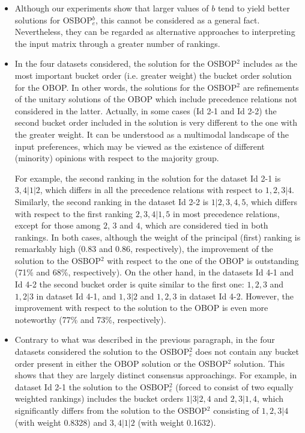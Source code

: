 \documentclass[preprint,12pt]{article}
\theoremstyle{definition}
\theoremstyle{remark}
\theoremstyle{example} %
\begin{document}
\begin{itemize}   
    \item Although our experiments show that larger values of
$b$ tend to yield better solutions for OSBOP$^b_e$, this cannot be considered as a general fact. Nevertheless, they can be regarded as alternative approaches to interpreting the input matrix through a greater number of rankings.

    \item In the four datasets considered, the solution for the OSBOP$^2$ includes as the most important bucket order (i.e. greater weight) the bucket order  solution for the OBOP. In other words, the solutions for the OSBOP$^2$ are refinements of the unitary solutions of the OBOP which include precedence relations not considered in the latter.
   Actually, in some cases (Id 2-1 and Id 2-2) the second bucket order included in the solution is very different to the one with the greater weight. 
   It can be understood as a multimodal landscape of the input preferences, which may be viewed as the existence of different (minority) opinions with respect to the majority group.  
   
   For example, the second ranking in the solution for the dataset Id 2-1 is $3,4|1|2$, which differs in all the precedence relations with respect to  $1,2,3|4$. Similarly, the second ranking in  the dataset Id 2-2 is $1|2,3,4,5$, which differs with respect to the first ranking $2,3,4|1,5$ in most precedence relations, except for those among $2$, $3$ and $4$, which are considered tied in both rankings. In both cases, although the weight of the principal (first) ranking is remarkably high  (0.83 and 0.86, respectively), the improvement of the solution to the OSBOP$^2$ with respect to the one of the OBOP is outstanding (71\% and 68\%, respectively). 
   On the other hand, in the datasets Id 4-1 and Id 4-2 the second bucket order is quite similar to the first one: $1,2,3$ and $1,2|3$ in dataset Id 4-1, and $1,3|2$ and $1,2,3$ in dataset Id 4-2. However, the improvement with respect to the solution to the OBOP is even more noteworthy (77\% and 73\%, respectively).
   
   \item Contrary to what was described in the previous paragraph, in the four datasets considered the solution to the OSBOP$^2_e$  does not contain any bucket order present in either the OBOP solution or the OSBOP$^2$ solution.
    This shows that they are largely distinct consensus approachings. For example, in dataset Id 2-1 the solution to the OSBOP$^2_e$ (forced to consist of two equally weighted rankings) includes the bucket orders $1|3|2,4$ and $2,3|1,4$, which significantly differs from the solution to the OSBOP$^2$ consisting of $1,2,3|4$ (with weight 0.8328) and $3,4|1|2$ (with weight 0.1632). 
   

\end{itemize}
\end{document}
